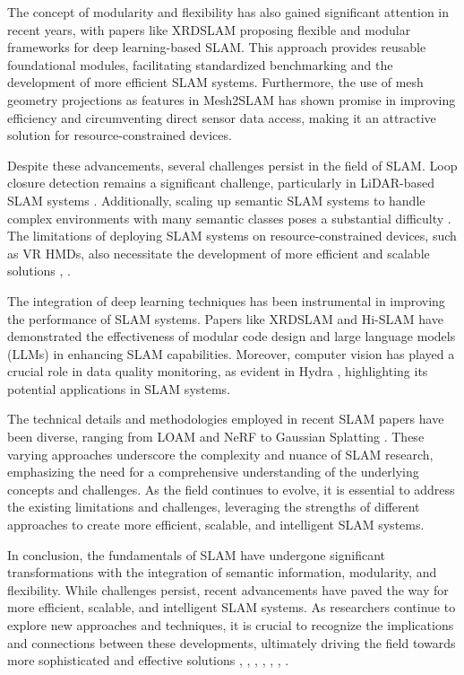 \documentclass[conference]{IEEEtran}
\begin{document}
The concept of modularity and flexibility has also gained significant attention in recent years, with papers like XRDSLAM \cite{b5} proposing flexible and modular frameworks for deep learning-based SLAM. This approach provides reusable foundational modules, facilitating standardized benchmarking and the development of more efficient SLAM systems. Furthermore, the use of mesh geometry projections as features in Mesh2SLAM \cite{b6} has shown promise in improving efficiency and circumventing direct sensor data access, making it an attractive solution for resource-constrained devices.

Despite these advancements, several challenges persist in the field of SLAM. Loop closure detection remains a significant challenge, particularly in LiDAR-based SLAM systems \cite{b3}. Additionally, scaling up semantic SLAM systems to handle complex environments with many semantic classes poses a substantial difficulty \cite{b4}. The limitations of deploying SLAM systems on resource-constrained devices, such as VR HMDs, also necessitate the development of more efficient and scalable solutions \cite{b5}, \cite{b6}.

The integration of deep learning techniques has been instrumental in improving the performance of SLAM systems. Papers like XRDSLAM \cite{b5} and Hi-SLAM \cite{b4} have demonstrated the effectiveness of modular code design and large language models (LLMs) in enhancing SLAM capabilities. Moreover, computer vision has played a crucial role in data quality monitoring, as evident in Hydra \cite{b7}, highlighting its potential applications in SLAM systems.

The technical details and methodologies employed in recent SLAM papers have been diverse, ranging from LOAM \cite{b3} and NeRF \cite{b5} to Gaussian Splatting \cite{b4}. These varying approaches underscore the complexity and nuance of SLAM research, emphasizing the need for a comprehensive understanding of the underlying concepts and challenges. As the field continues to evolve, it is essential to address the existing limitations and challenges, leveraging the strengths of different approaches to create more efficient, scalable, and intelligent SLAM systems.

In conclusion, the fundamentals of SLAM have undergone significant transformations with the integration of semantic information, modularity, and flexibility. While challenges persist, recent advancements have paved the way for more efficient, scalable, and intelligent SLAM systems. As researchers continue to explore new approaches and techniques, it is crucial to recognize the implications and connections between these developments, ultimately driving the field towards more sophisticated and effective solutions \cite{b1}, \cite{b2}, \cite{b3}, \cite{b4}, \cite{b5}, \cite{b6}, \cite{b7}.
\end{document}
